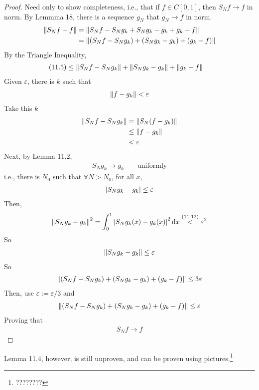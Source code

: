 \begin{proof}
    Need only to show completeness, i.e., that if $f \in C[0,1]$, then $S_Nf \to f$ in norm. By Lemmma 18, there is a sequence $g_N$ that $g_N \to f$ in norm.
    \begin{align}
        \norm{S_Nf - f} &= \norm{S_Nf - S_Ng_k + S_Ng_k - g_k + g_k - f}\\
        &= \norm{(S_Nf - S_Ng_k) + (S_Ng_k - g_k) + (g_k - f)}
    \end{align}
    By the Triangle Inequality,
    \begin{align}
        (11.5) &\le \norm{S_Nf - S_Ng_k} + \norm{S_Ng_k - g_k} + \norm{g_k - f}
    \end{align}
    Given $\varepsilon$, there is $k$ such that
    \begin{align}
        \norm{f - g_k} < \varepsilon
    \end{align}
    Take this $k$
    \begin{align}
        \norm{S_Nf - S_Ng_k} &= \norm{S_N(f-g_k)}\\
        &\le \norm{f-g_k}\\
        &< \varepsilon
    \end{align}
    Next, by Lemma 11.2,
    \begin{align}
        S_Ng_k \to g_k && \text{ uniformly}
    \end{align}
    i.e., there is $N_0$ such that $\forall N > N_0$, for all $x$,
    \begin{align}
        \abs{S_Ng_k - g_k} \le \varepsilon
    \end{align}
    Then,
    \begin{align}
        \norm{S_Ng_k - g_k}^2 = \int_0^1 \abs{S_Ng_k(x) - g_k(x)}^2 \dd{x} \stackrel{(11.12)}{<} \varepsilon^2
    \end{align}
    So
    \begin{align}
        \norm{S_Ng_k - g_k} \le \varepsilon
    \end{align}
    So
    \begin{align}
        \norm{(S_Nf - S_Ng_k) + (S_Ng_k - g_k) + (g_k - f)} \le 3\varepsilon
    \end{align}
    Then, use $\varepsilon := \varepsilon/3$ and
    \begin{align}
        \norm{(S_Nf - S_Ng_k) + (S_Ng_k - g_k) + (g_k - f)} \le \varepsilon
    \end{align}
    Proving that
    \begin{align}
        S_Nf \to f
    \end{align}
\end{proof}
Lemma 11.4, however, is still unproven, and can be proven using pictures.\footnote{????????}